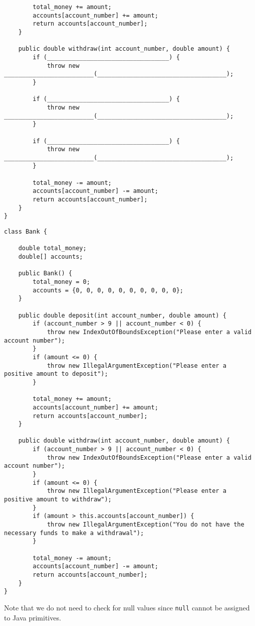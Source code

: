 \begin{parts}
\begin{lstlisting}
        total_money += amount;
        accounts[account_number] += amount;
        return accounts[account_number];
    }
 
    public double withdraw(int account_number, double amount) {
        if (__________________________________) {
            throw new _________________________(____________________________________);
        }
        
        if (__________________________________) {
            throw new _________________________(____________________________________);
        }
        
        if (__________________________________) {
            throw new _________________________(____________________________________);
        }

        total_money -= amount;
        accounts[account_number] -= amount;
        return accounts[account_number];
    }
}
\end{lstlisting}
\fi

\begin{solution}
\begin{lstlisting}
class Bank {

    double total_money;
    double[] accounts;
    
    public Bank() {
        total_money = 0;
        accounts = {0, 0, 0, 0, 0, 0, 0, 0, 0, 0};
    }

    public double deposit(int account_number, double amount) {
        if (account_number > 9 || account_number < 0) {
            throw new IndexOutOfBoundsException("Please enter a valid account number");
        }
        if (amount <= 0) {
            throw new IllegalArgumentException("Please enter a positive amount to deposit");
        }
        
        total_money += amount;
        accounts[account_number] += amount;
        return accounts[account_number];
    }

    public double withdraw(int account_number, double amount) {
        if (account_number > 9 || account_number < 0) {
            throw new IndexOutOfBoundsException("Please enter a valid account number");
        }
        if (amount <= 0) {
            throw new IllegalArgumentException("Please enter a positive amount to withdraw");
        }
        if (amount > this.accounts[account_number]) {
            throw new IllegalArgumentException("You do not have the necessary funds to make a withdrawal");
        }
        
        total_money -= amount;
        accounts[account_number] -= amount;
        return accounts[account_number];
    }
}
\end{lstlisting}
Note that we do not need to check for null values since \lstinline{null} cannot be assigned to Java primitives.
\end{solution}
    
\end{parts}